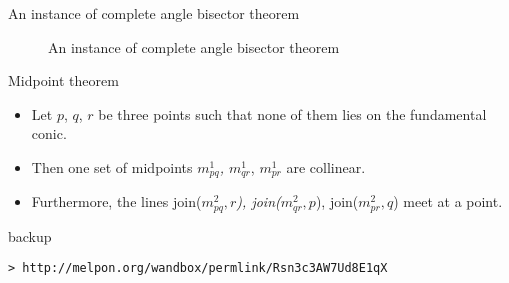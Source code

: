 \documentclass[10pt,ignorenonframetext,serif,onlymath]{beamer}
\begin{document}
\begin{frame}{An instance of complete angle bisector theorem}
\protect\hypertarget{sec:an-instance-of-complete-angle-bisector-theorem}{}

\begin{figure}[hp]
\centering

\caption{An instance of complete angle bisector theorem}
\label{fig:bisectortheorem}
\end{figure}

\end{frame}

\begin{frame}{Midpoint theorem}
\protect\hypertarget{sec:midpoint-theorem}{}

\begin{itemize}
\item
  Let \(p\), \(q\), \(r\) be three points such that none of them lies on
  the fundamental conic.
\item
  Then one set of midpoints \(m^1_{pq}\)\emph{, \(m^1_{qr}\)},
  \(m^1_{pr}\) are collinear.
\item
  Furthermore, the lines join(\(m^2_{pq}, r\)\emph{),
  join(\(m^2_{qr}, p\)}), join(\(m^2_{pr}, q\)) meet at a point.
\end{itemize}

\end{frame}

\begin{frame}[fragile]{backup}
\protect\hypertarget{sec:backup}{}

\begin{verbatim}
> http://melpon.org/wandbox/permlink/Rsn3c3AW7Ud8E1qX
\end{verbatim}

\end{frame}
\end{document}

